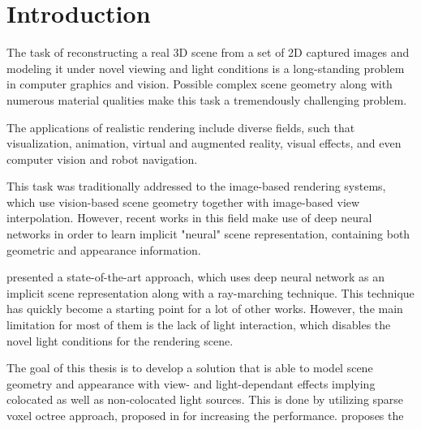 \chapter{Introduction}
\label{chap:introduction}


The task of reconstructing a real 3D scene from a set of 2D captured images
and modeling it under novel viewing and light conditions
is a long-standing problem in computer graphics and vision.
Possible complex scene geometry along with numerous material qualities
make this task a tremendously challenging problem.

The applications of realistic rendering include diverse fields, such that
visualization, animation, virtual and augmented reality, visual effects,
and even computer vision and robot navigation.

This task was traditionally addressed to the image-based rendering systems,
which use vision-based scene geometry together with image-based view interpolation. \cite{shumandkang2000}
However, recent works in this field make use of deep neural networks
in order to learn implicit "neural" scene representation,
containing both geometric and appearance information. \cite{tewari2020state}

\cite{mildenhall2020nerf} presented a state-of-the-art approach,
which uses deep neural network as an implicit scene representation
along with a ray-marching technique. 
This technique has quickly become a starting point for a lot of other works. 
However, the main limitation for most of them is the lack of light interaction,
which disables the novel light conditions for the rendering scene.

The goal of this thesis is to develop a solution
that is able to model scene geometry and appearance
with view- and light-dependant effects
implying colocated as well as non-colocated light sources.
This is done by utilizing sparse voxel octree approach,
proposed in \cite{liu2021neural} for increasing the performance.
\cite{bi2020neural} proposes the




